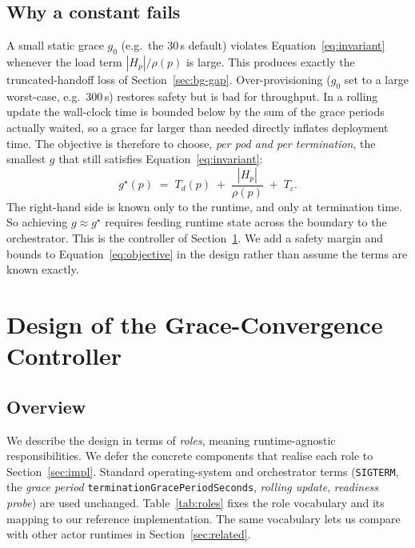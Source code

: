 \documentclass[AMA,Times1COL]{WileyNJDv5}
\begin{document}
\subsection{Why a constant fails}\label{sec:model-constant}
A small static grace $g_0$ (e.g.\ the 30\,s default) violates Equation~\eqref{eq:invariant} whenever
the load term $|H_p|/\rho(p)$ is large. This produces exactly the truncated-handoff loss of
Section~\ref{sec:bg-gap}. Over-provisioning ($g_0$ set to a large worst-case, e.g.\ 300\,s) restores
safety but is bad for throughput. In a rolling update the wall-clock time is bounded below by the
sum of the grace periods actually waited, so a grace far larger than needed directly inflates
deployment time. The objective is therefore to choose, \emph{per pod and per termination}, the
smallest $g$ that still satisfies Equation~\eqref{eq:invariant}:
\begin{equation}\label{eq:objective}
  g^\star(p) \;=\; T_d(p) \;+\; \frac{|H_p|}{\rho(p)} \;+\; T_c .
\end{equation}
The right-hand side is known only to the runtime, and only at termination time. So achieving
$g \approx g^\star$ requires feeding runtime state across the boundary to the orchestrator. This is the
controller of Section~\ref{sec:design}. We add a safety margin and bounds to
Equation~\eqref{eq:objective} in the design rather than assume the terms are known exactly.

\section{Design of the Grace-Convergence Controller}\label{sec:design}
\subsection{Overview}\label{sec:design-overview}



We describe the design in terms of \emph{roles}, meaning runtime-agnostic
responsibilities. We defer the concrete components that realise each role to
Section~\ref{sec:impl}. Standard operating-system and orchestrator terms
(\texttt{SIGTERM}, the \emph{grace period} \texttt{terminationGracePeriodSeconds},
\emph{rolling update}, \emph{readiness probe}) are used unchanged. Table~\ref{tab:roles}
fixes the role vocabulary and its mapping to our reference implementation. The same
vocabulary lets us compare with other actor runtimes in Section~\ref{sec:related}.
\end{document}
